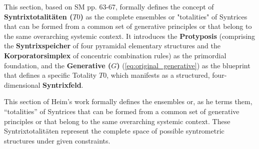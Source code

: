 \documentclass[12pt]{article}
\newcommand{\q}[1]{\enquote{#1}}
\newcommand{\syntrixtotalitaet}{T0}
\newcommand{\generative}{G}
\begin{document}
This section, based on SM pp. 63-67, formally defines the concept of \textbf{Syntrixtotalitäten (\(\syntrixtotalitaet\))} as the complete ensembles or "totalities" of Syntrices that can be formed from a common set of generative principles or that belong to the same overarching systemic context. It introduces the \textbf{Protyposis} (comprising the \textbf{Syntrixspeicher} of four pyramidal elementary structures and the \textbf{Korporatorsimplex} of concentric combination rules) as the primordial foundation, and the \textbf{Generative (\(\generative\))} (\eqref{eq:original_generative}) as the blueprint that defines a specific Totality \( \syntrixtotalitaet \), which manifests as a structured, four-dimensional \textbf{Syntrixfeld}.

This section of Heim's work formally defines the ensembles or, as he terms them, \q{totalities} of Syntrices that can be formed from a common set of generative principles or that belong to the same overarching systemic context. These Syntrixtotalitäten represent the complete space of possible syntrometric structures under given constraints.
\end{document}
